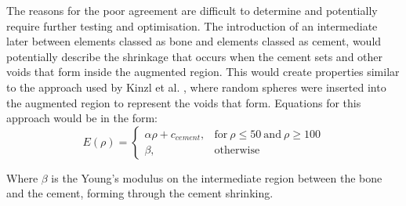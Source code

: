 The reasons for the poor agreement are difficult to determine and potentially
require further testing and optimisation. The introduction of an intermediate
later between elements classed as bone and elements classed as cement, would
potentially describe the shrinkage that occurs when the cement sets and other
voids that form inside the augmented region. This would create properties
similar to the approach used by Kinzl et al. \cite{kinzl2013experimentally},
where random spheres were inserted into the augmented region to represent the
voids that form. Equations for this approach would be in the form:
\begin{equation}
	E(\rho)= 
	\begin{cases}
	\alpha \rho + c_{cement}, & \text{for}\ \rho \leq 50\ \text{and}\ \rho \geq 100 \\
	\beta, & \text{otherwise}
	\end{cases}
\end{equation}

Where $\beta$ is the Young's modulus on the intermediate region between the
bone and the cement, forming through the cement shrinking.
